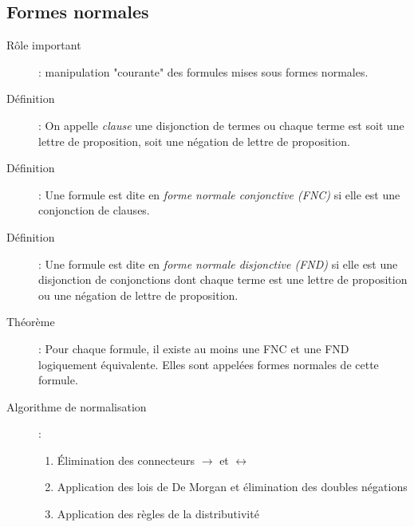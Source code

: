 \documentclass[10pt,a4paper]{article}
\begin{document}
	\subsection{Formes normales}
		\begin{description}
			\item[Rôle important]: manipulation "courante" des formules mises sous formes normales.
			\item[Définition]: On appelle \emph{clause} une disjonction de termes ou chaque terme est soit une lettre de proposition, soit une négation de lettre de proposition.
			\item[Définition]: Une formule est dite en \emph{forme normale conjonctive (FNC)} si elle est une conjonction de clauses.
			\item[Définition]: Une formule est dite en \emph{forme normale disjonctive (FND)} si elle est une disjonction de conjonctions dont chaque terme est une lettre de proposition ou une négation de lettre de proposition.
			\item[Théorème]: Pour chaque formule, il existe au moins une FNC et une FND logiquement équivalente. Elles sont appelées formes normales de cette formule.
			\item[Algorithme de normalisation]:
				\begin{enumerate}
					\item Élimination des connecteurs $\rightarrow$ et $\leftrightarrow$
					\item Application des lois de De Morgan et élimination des doubles négations
					\item Application des règles de la distributivité
				\end{enumerate}
		\end{description}
\end{document}
